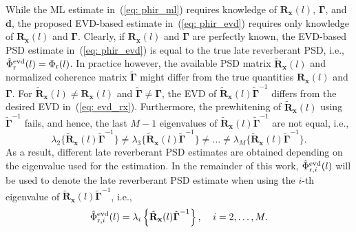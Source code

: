 \documentclass{article}
\begin{document}
While the ML estimate in~(\ref{eq: phir_ml}) requires knowledge of $\mathbf{R}_{\mathbf{x}}(l)$, $\boldsymbol{\Gamma}$, and $\mathbf{d}$, the proposed EVD-based estimate in~(\ref{eq: phir_evd}) requires only knowledge of $\mathbf{R}_{\mathbf{x}}(l)$ and $\boldsymbol{\Gamma}$.
Clearly, if $\mathbf{R}_{\mathbf{x}}(l)$ and $\boldsymbol{\Gamma}$ are perfectly known, the EVD-based PSD estimate in~(\ref{eq: phir_evd}) is equal to the true late reverberant PSD, i.e., $\hat{\Phi}^{\rm evd}_{\rm r}(l) = \Phi_{\rm r}(l)$.
In practice however, the available PSD matrix $\tilde{\mathbf{R}}_{\mathbf{x}}(l)$ and normalized coherence matrix $\tilde{\boldsymbol{\Gamma}}$ might differ from the true quantities $\mathbf{R}_{\mathbf{x}}(l)$ and $\boldsymbol{\Gamma}$. 
For $\tilde{\mathbf{R}}_{\mathbf{x}}(l) \neq \mathbf{R}_{\mathbf{x}}(l)$ and $\tilde{\boldsymbol{\Gamma}} \neq \boldsymbol{\Gamma}$, the EVD of $\tilde{\mathbf{R}}_{\mathbf{x}}(l) \tilde{\boldsymbol{\Gamma}}^{-1}$ differs from the desired EVD in~(\ref{eq: evd_rx}).
Furthermore, the prewhitening of $\tilde{\mathbf{R}}_{\mathbf{x}}(l)$ using $\tilde{\boldsymbol{\Gamma}}^{-1}$ fails, and hence, the last $M-1$ eigenvalues of $\tilde{\mathbf{R}}_{\mathbf{x}}(l)\tilde{\boldsymbol{\Gamma}}^{-1}$ are not equal, i.e.,
\begin{equation}
\lambda_2\{\tilde{\mathbf{R}}_{\mathbf{x}}(l) \tilde{\boldsymbol{\Gamma}}^{-1}\} \neq \lambda_3\{\tilde{\mathbf{R}}_{\mathbf{x}}(l) \tilde{\boldsymbol{\Gamma}}^{-1}\} \neq \ldots \neq \lambda_M\{\tilde{\mathbf{R}}_{\mathbf{x}}(l) \tilde{\boldsymbol{\Gamma}}^{-1}\}.
\end{equation}
As a result, different late reverberant PSD estimates are obtained depending on the eigenvalue used for the estimation.
In the remainder of this work, $\hat{\Phi}^{\rm evd}_{{\rm r},i}(l)$ will be used to denote the late reverberant PSD estimate when using the $i$-th eigenvalue of $\tilde{\mathbf{R}}_{\mathbf{x}}(l)\tilde{\boldsymbol{\Gamma}}^{-1}$, i.e.,
\begin{equation}
\label{eq: psd_evd_mis1}
\hat{\Phi}_{{\rm r},i}^{\rm evd}(l) = \lambda_i\left\{ \tilde{\mathbf{R}}_{\mathbf{x}}(l) \tilde{\boldsymbol{\Gamma}}^{-1} \right\}, \; \; \; \; i = 2, \ldots, M.
\end{equation}
\end{document}
